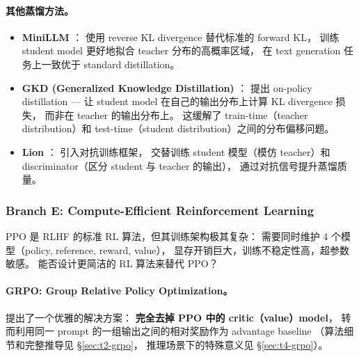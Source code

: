 \paragraph{其他蒸馏方法。}
\begin{itemize}[leftmargin=2em]
  \item \textbf{MiniLLM} \cite{gu2023minillm}：
    使用 reverse KL divergence 替代标准的 forward KL，
    训练 student model 更好地拟合 teacher 分布的高概率区域，
    在 text generation 任务上一致优于 standard distillation。

  \item \textbf{GKD (Generalized Knowledge Distillation)} \cite{agarwal2023gkd}：
    提出 on-policy distillation ---
    让 student model 在自己的输出分布上计算 KL divergence 损失，
    而非在 teacher 的输出分布上。
    这缓解了 train-time（teacher distribution）和
    test-time（student distribution）之间的分布偏移问题。

  \item \textbf{Lion} \cite{jiang2023lion}：
    引入对抗训练框架，
    交替训练 student 模型（模仿 teacher）和
    discriminator（区分 student 与 teacher 的输出），
    通过对抗信号提升蒸馏质量。
\end{itemize}

\subsubsection{Branch E: Compute-Efficient Reinforcement Learning}
\label{sec:t7-compute-rl}

\begin{problembox}
PPO 是 RLHF 的标准 RL 算法，但其训练架构极其复杂：
需要同时维护 4 个模型（policy, reference, reward, value），
显存开销巨大，训练不稳定性高，超参数敏感。
能否设计更简洁的 RL 算法来替代 PPO？
\end{problembox}

\paragraph{GRPO: Group Relative Policy Optimization。}
 提出了一个优雅的解决方案：
\textbf{完全去掉 PPO 中的 critic（value）model}，
转而利用同一 prompt 的一组输出之间的相对奖励作为 advantage baseline
（算法细节和完整推导见 \S\ref{sec:t2-grpo}，
推理场景下的特殊意义见 \S\ref{sec:t4-grpo}）。

